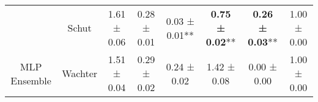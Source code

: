\begin{table}
{\begin{tabular}[t]{cccccccc}
 & Schut & 1.61 ± 0.06\hphantom{*}\hphantom{*} & 0.28 ± 0.01\hphantom{*}\hphantom{*} & 0.03 ± 0.01** & \textbf{0.75 ± 0.02}** & \textbf{0.26 ± 0.03}** & 1.00 ± 0.00\hphantom{*}\hphantom{*}\\

\multirow[t]{-9}{*}{\centering\arraybackslash MLP Ensemble} & Wachter & 1.51 ± 0.04\hphantom{*}\hphantom{*} & 0.29 ± 0.02\hphantom{*}\hphantom{*} & 0.24 ± 0.02\hphantom{*}\hphantom{*} & 1.42 ± 0.08\hphantom{*}\hphantom{*} & 0.00 ± 0.00\hphantom{*}\hphantom{*} & 1.00 ± 0.00\hphantom{*}\hphantom{*}\\
\bottomrule
\end{tabular}}
\end{table}
